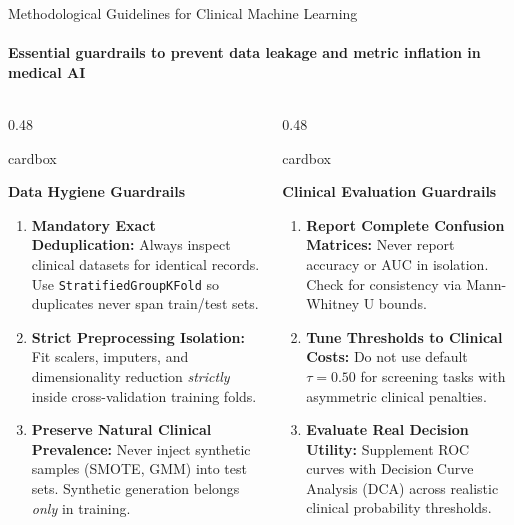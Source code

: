 \documentclass[aspectratio=169, 10pt]{beamer}
\newcommand{\cardbox}[3]{%
  \begin{beamercolorbox}[wd=\linewidth,rounded=true,sep=2.5pt]{cardbox}%
    {\bfseries\scriptsize\color{#1}#2\par}\vspace*{1pt}%
    {\footnotesize #3}%
  \end{beamercolorbox}%
}
\begin{document}
\begin{frame}{Methodological Guidelines for Clinical Machine Learning}
  \framesubtitle{Essential guardrails to prevent data leakage and metric inflation in medical AI}

  \begin{columns}[T]
    \begin{column}{0.48\textwidth}
      \cardbox{DeepPurple}{Data Hygiene Guardrails}{
        \begin{enumerate}\setlength\itemsep{1.5pt}\scriptsize
          \item \textbf{Mandatory Exact Deduplication:} Always inspect clinical datasets for identical records. Use \texttt{StratifiedGroupKFold} so duplicates never span train/test sets.
          \item \textbf{Strict Preprocessing Isolation:} Fit scalers, imputers, and dimensionality reduction \textit{strictly} inside cross-validation training folds.
          \item \textbf{Preserve Natural Clinical Prevalence:} Never inject synthetic samples (SMOTE, GMM) into test sets. Synthetic generation belongs \textit{only} in training.
        \end{enumerate}
      }
    \end{column}

    \begin{column}{0.48\textwidth}
      \cardbox{TealAccent}{Clinical Evaluation Guardrails}{
        \begin{enumerate}\setlength\itemsep{1.5pt}\scriptsize
          \item \textbf{Report Complete Confusion Matrices:} Never report accuracy or AUC in isolation. Check for consistency via Mann-Whitney U bounds.
          \item \textbf{Tune Thresholds to Clinical Costs:} Do not use default $\tau=0.50$ for screening tasks with asymmetric clinical penalties.
          \item \textbf{Evaluate Real Decision Utility:} Supplement ROC curves with Decision Curve Analysis (DCA) across realistic clinical probability thresholds.
        \end{enumerate}
      }
    \end{column}
  \end{columns}
\end{frame}
\end{document}
